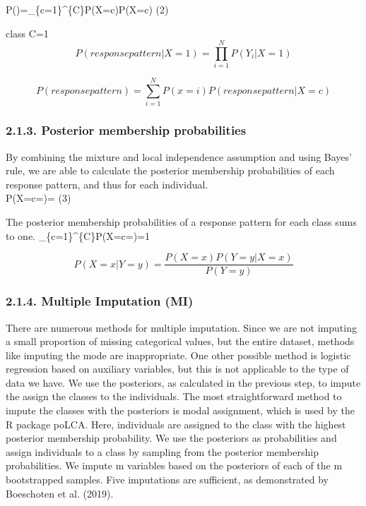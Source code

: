 \documentclass[
]{article}
\begin{document}
P\left(\right)=\sum\_\{c=1\}\^{}\{C\}P\left(X=c\right)P\left(\textbar X=c\right)
(2)

class C=1 \[ P(response pattern|X=1)=\prod_{i=1}^N P(Y_i |X=1) \]

\[P(response pattern)= \sum^N_{i=1} P(x=i)P(response pattern|X=c)\]

\hypertarget{posterior-membership-probabilities}{%
\subsubsection{2.1.3. Posterior membership
probabilities}\label{posterior-membership-probabilities}}

By combining the mixture and local independence assumption and using
Bayes' rule, we are able to calculate the posterior membership
probabilities of each response pattern, and thus for each individual.\\
P\left(X=c\textbar{}=\right)=
(3)

The posterior membership probabilities of a response pattern for each
class sums to one.
\sum\_\{c=1\}\^{}\{C\}P\left(X=c\textbar{}=\right)=1

\[P(X=x|Y=y)= \frac{P(X=x)  P(Y=y|X=x)}{ P(Y=y)} \]

\hypertarget{multiple-imputation-mi}{%
\subsubsection{2.1.4. Multiple Imputation
(MI)}\label{multiple-imputation-mi}}

There are numerous methods for multiple imputation. Since we are not
imputing a small proportion of missing categorical values, but the
entire dataset, methods like imputing the mode are inappropriate. One
other possible method is logistic regression based on auxiliary
variables, but this is not applicable to the type of data we have. We
use the posteriors, as calculated in the previous step, to impute the
assign the classes to the individuals. The most straightforward method
to impute the classes with the posteriors is modal assignment, which is
used by the R package poLCA. Here, individuals are assigned to the class
with the highest posterior membership probability. We use the posteriors
as probabilities and assign individuals to a class by sampling from the
posterior membership probabilities. We impute m variables based on the
posteriors of each of the m bootstrapped samples. Five imputations are
sufficient, as demonstrated by Boeschoten et al. (2019).
\end{document}
